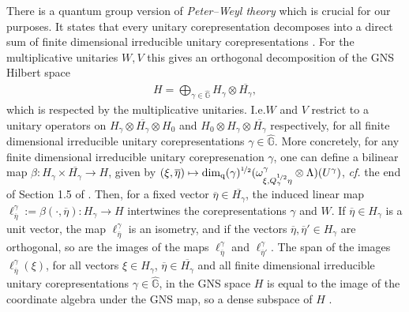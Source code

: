 \documentclass{amsart}
\theoremstyle{plain}
\theoremstyle{definition}
\theoremstyle{remark}
\begin{document}
	There is a quantum group version of \emph{Peter--Weyl theory} which is crucial for our purposes.
	It states that every unitary corepresentation decomposes into a direct sum of finite dimensional irreducible unitary corepresentations \cite[Theorem 1.5.4]{NT13}.
	For the multiplicative unitaries $W, V$ this gives an orthogonal decomposition of the GNS Hilbert space
	\begin{align}\label{eqn:Peter--Weyl-decomposition}
		H = \bigoplus_{\gamma \in \widehat{\mathbb{G}}} H_\gamma \otimes \overline{H_\gamma},
	\end{align}
	which is respected by the multiplicative unitaries.
	I.e.\@ $W$ and $V$ restrict to a unitary operators on $H_\gamma \otimes \overline{H_\gamma} \otimes H_0$ and $H_0 \otimes H_\gamma \otimes \overline{H_\gamma}$ respectively, for all finite dimensional irreducible unitary corepresentations $\gamma \in \widehat{\mathbb{G}}$.
	More concretely, for any finite dimensional irreducible unitary corepresenation $\gamma$, one can define a bilinear map $\beta : H_\gamma \times \overline{H_\gamma} \rightarrow H$, given by $(\xi,\overline{\eta}) \mapsto \dim_\mathrm{q}(\gamma)^{\nicefrac{1}{2}} (\omega_{\xi,Q_\gamma^{\nicefrac{1}{2}}  \eta}^\gamma \otimes \Lambda)(U^\gamma)$, \emph{cf.\@} the end of Section 1.5 of \cite{NT13}.
	Then, for a fixed vector $\overline{\eta} \in \overline{H_\gamma}$, the induced linear map $\ell^\gamma_{\overline{\eta}} := \beta(\cdot,\overline{\eta}) : H_\gamma \rightarrow H$ intertwines the corepresentations $\gamma$ and $W$.
	If $\overline{\eta} \in H_\gamma$ is a unit vector, the map $\ell^\gamma_{\overline{\eta}}$ is an isometry, and if the vectors $\overline{\eta}, \overline{\eta}' \in H_\gamma$ are orthogonal, so are the images of the maps $\ell^\gamma_{\overline{\eta}}$ and $\ell^\gamma_{\overline{\eta}'}$.
	The span of the images $\ell^\gamma_{\overline{\eta}}(\xi)$, for all vectors $\xi \in H_\gamma$, $\overline{\eta} \in \overline{H_\gamma}$ and all finite dimensional irreducible unitary corepresentations $\gamma \in \widehat{\mathbb{G}}$, in the GNS space $H$ is equal to the image of the coordinate algebra under the GNS map, so a dense subspace of $H$ \cite[Corollary 1.5.5]{NT13}.
	
\end{document}
